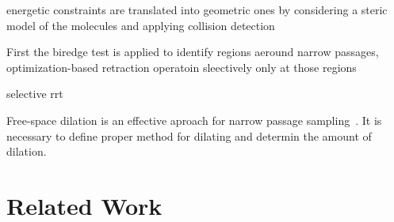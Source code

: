\documentclass[letterpaper, 10 pt, conference]{ieeeconf} %
\begin{document}

energetic constraints are translated into geometric ones by considering a steric model of the molecules and applying collision detection
\cite{deAngulo2005biocd}

First the biredge test is applied to identify regions aeround narrow passages, optimization-based retraction operatoin sleectively only at those regions

selective rrt~\cite{lee2012srrrt}

Free-space dilation is an effective aproach for narrow passage sampling~\cite{hsuMultiLevel}. 
It is necessary to define proper method for dilating and determin the amount of dilation.

\section{Related Work}
\end{document}
